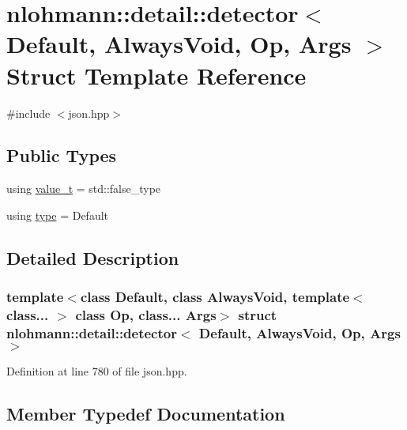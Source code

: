 \hypertarget{structnlohmann_1_1detail_1_1detector}{}\section{nlohmann\+::detail\+::detector$<$ Default, Always\+Void, Op, Args $>$ Struct Template Reference}
\label{structnlohmann_1_1detail_1_1detector}


{\ttfamily \#include $<$json.\+hpp$>$}

\subsection*{Public Types}
\begin{DoxyCompactItemize}
\item 
using \mbox{\hyperlink{structnlohmann_1_1detail_1_1detector_a5a132aab543d1706e2439268faf8d487}{value\+\_\+t}} = std\+::false\+\_\+type
\item 
using \mbox{\hyperlink{structnlohmann_1_1detail_1_1detector_a0cd69423587748bf3d3d702cc7b7c2ce}{type}} = Default
\end{DoxyCompactItemize}


\subsection{Detailed Description}
\subsubsection*{template$<$class Default, class Always\+Void, template$<$ class... $>$ class Op, class... Args$>$\newline
struct nlohmann\+::detail\+::detector$<$ Default, Always\+Void, Op, Args $>$}



Definition at line 780 of file json.\+hpp.



\subsection{Member Typedef Documentation}
\mbox{\label{structnlohmann_1_1detail_1_1detector_a0cd69423587748bf3d3d702cc7b7c2ce}} 
